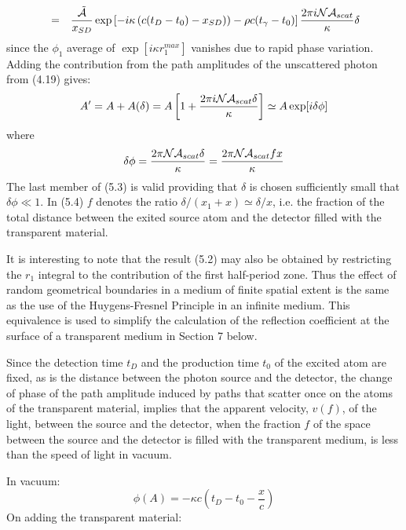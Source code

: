 {\begin{eqnarray}
      & = & \frac{\tilde{{\cal A}}}{x_{SD}}\exp\left[ -i \kappa \left(c(t_D-t_0)- x_{SD})
   \right)-\rho c (t_{\gamma}-t_0)\right] \frac{ 2 \pi i {\cal N} {\cal A}_{scat}}{\kappa} \delta
  \end{eqnarray}
  since the  $\phi_1$ average of $\exp[i\kappa r_1^{max}]$ vanishes due to rapid phase variation. 
  Adding the contribution from the path amplitudes of the unscattered photon from (4.19) gives:
   \begin{equation}
  A' = A + A(\delta) = A \left[ 1+\frac{ 2 \pi i {\cal N} { \cal A}_{scat} \delta}
  {\kappa}\right] \simeq A \exp[i \delta \phi] 
 \end{equation}
   where 
   \begin{equation} 
\delta \phi = \frac{  2 \pi {\cal N} {\cal A}_{scat }\delta}{\kappa}
  =  \frac{  2 \pi {\cal N} {\cal A}_{scat } f x}{\kappa}
 \end{equation}
  The last member of (5.3) is valid providing that $\delta$ is chosen sufficiently small
  that $\delta \phi \ll 1$. In (5.4) $f$ denotes the ratio $\delta/(x_1+x) \simeq \delta/x$, i.e. 
  the fraction of the total distance between the exited source atom and the detector 
  filled with the transparent material.
   \par It is interesting to note that the result (5.2) may also be obtained by restricting the $r_1$
   integral to the contribution of the first half-period zone. Thus the effect of random geometrical
  boundaries in a medium of finite spatial extent is the same as the use of the Huygens-Fresnel Principle
  in an infinite medium. This equivalence is used to simplify the calculation of the reflection
   coefficient at the surface of a transparent medium in Section 7 below. 
  \par Since the detection time $t_D$ and the production time $t_0$ of the excited atom are fixed, as is the
  distance between the photon source and the detector, the change of phase of the path amplitude induced
  by paths that scatter once on the atoms of the transparent material, implies that the apparent
  velocity, $v(f)$, of the light, between the source and the detector, when the fraction $f$ of the
  space between the source and the detector is filled with the transparent medium, is less than the
  speed of light in vacuum.
 \par In vacuum:
     \begin{equation}
   \phi(A) =  - \kappa c\left(t_D-t_0-\frac{x}{c} \right)
 \end{equation}
  On adding the transparent material:
}
